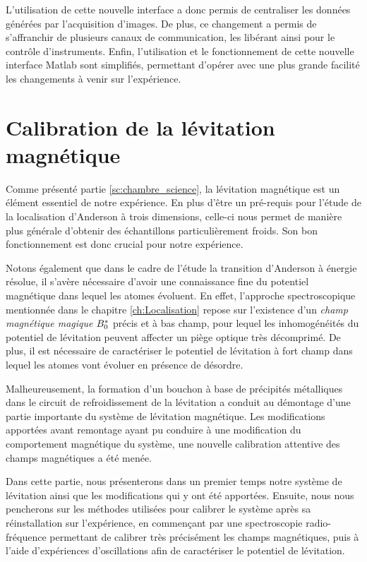 L'utilisation de cette nouvelle interface a donc permis de centraliser les données générées par l'acquisition d'images. De plus, ce changement a permis de s'affranchir de plusieurs canaux de communication, les libérant ainsi pour le contrôle d'instruments. Enfin, l'utilisation et le fonctionnement de cette nouvelle interface Matlab sont simplifiés, permettant d'opérer avec une plus grande facilité les changements à venir sur l'expérience.











\section{Calibration de la lévitation magnétique}
\label{sc:levitation}
Comme présenté partie \ref{sc:chambre_science}, la lévitation magnétique est un élément essentiel de notre expérience. En plus d'être un pré-requis pour l'étude de la localisation d'Anderson à trois dimensions, celle-ci nous permet de manière plus générale d'obtenir des échantillons particulièrement froids. Son bon fonctionnement est donc crucial pour notre expérience. 

Notons également que dans le cadre de l'étude la transition d'Anderson à énergie résolue, il s'avère nécessaire d'avoir une connaissance fine du potentiel magnétique dans lequel les atomes évoluent. En effet, l'approche spectroscopique mentionnée dans le chapitre \ref{ch:Localisation} repose sur l'existence d'un \emph{champ magnétique magique} $B_0^*$ précis et à bas champ, pour lequel les inhomogénéités du potentiel de lévitation peuvent affecter un piège optique très décomprimé. De plus, il est nécessaire de caractériser le potentiel de lévitation à fort champ dans lequel les atomes vont évoluer en présence de désordre.%

Malheureusement, la formation d'un bouchon à base de précipités métalliques dans le circuit de refroidissement de la lévitation a conduit au démontage d'une partie importante du système de lévitation magnétique. Les modifications apportées avant remontage ayant pu conduire à une modification du comportement magnétique du système, une nouvelle calibration attentive des champs magnétiques a été menée.

Dans cette partie, nous présenterons dans un premier temps notre système de lévitation ainsi que les modifications qui y ont été apportées. Ensuite, nous nous pencherons sur les méthodes utilisées pour calibrer le système après sa réinstallation sur l'expérience, en commençant par  une spectroscopie radio-fréquence permettant de calibrer très précisément les champs magnétiques, puis à l'aide d'expériences d'oscillations afin de caractériser le potentiel de lévitation.




